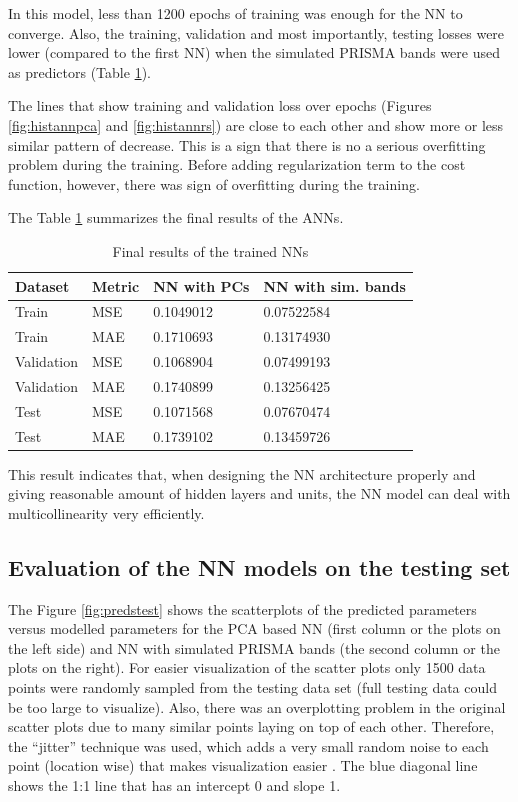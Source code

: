 \documentclass[a4paper, twoside]{templates/ociamthesis}
\begin{document}
In this model, less than 1200 epochs of training was enough for the NN to converge. Also, the training, validation and most importantly, testing losses were lower (compared to the first NN) when the simulated PRISMA bands were used as predictors (Table \ref{tab:losstable}).

The lines that show training and validation loss over epochs (Figures \ref{fig:histannpca} and \ref{fig:histannrs}) are close to each other and show more or less similar pattern of decrease. This is a sign that there is no a serious overfitting problem during the training. Before adding regularization term to the cost function, however, there was sign of overfitting during the training.

\newpage

The Table \ref{tab:losstable} summarizes the final results of the ANNs.

\begin{table}[H]

\caption{\label{tab:losstable}Final results of the trained NNs}
\centering
\begin{tabular}[t]{llll}
\toprule
Dataset & Metric & NN with PCs & NN with sim. bands\\
\midrule
Train & MSE & 0.1049012 & 0.07522584\\
Train & MAE & 0.1710693 & 0.13174930\\
Validation & MSE & 0.1068904 & 0.07499193\\
Validation & MAE & 0.1740899 & 0.13256425\\
Test & MSE & 0.1071568 & 0.07670474\\
\addlinespace
Test & MAE & 0.1739102 & 0.13459726\\
\bottomrule
\end{tabular}
\end{table}

This result indicates that, when designing the NN architecture properly and giving reasonable amount of hidden layers and units, the NN model can deal with multicollinearity very efficiently.

\hypertarget{evaluation-of-the-nn-models-on-the-testing-set}{%
\subsection{Evaluation of the NN models on the testing set}\label{evaluation-of-the-nn-models-on-the-testing-set}}

The Figure \ref{fig:predstest} shows the scatterplots of the predicted parameters versus modelled parameters for the PCA based NN (first column or the plots on the left side) and NN with simulated PRISMA bands (the second column or the plots on the right). For easier visualization of the scatter plots only 1500 data points were randomly sampled from the testing data set (full testing data could be too large to visualize). Also, there was an overplotting problem in the original scatter plots due to many similar points laying on top of each other. Therefore, the ``jitter'' technique was used, which adds a very small random noise to each point (location wise) that makes visualization easier \citep{wickham2016r, ggplot2}. The blue diagonal line shows the 1:1 line that has an intercept 0 and slope 1.
\end{document}
